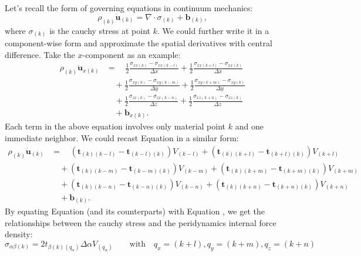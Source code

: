\documentclass[11pt,fullpage]{article}
\newcommand{\mb}[1]{\mathbf{#1}}
\newcommand{\blue}[1]{{\color{blue}{{#1}}}}
\begin{document}
Let's recall the form of governing equations in continuum mechanics:
\begin{equation}
\rho_{(k)}\ddot{\mb{u}}_{(k)} = \nabla\cdot\sigma_{(k)} + \mb{b}_{(k)},
\label{eq:4}
\end{equation}
where $\sigma_{(k)}$ is the cauchy stress at point $k$. We could further write it in a component-wise form and approximate the spatial derivatives with central difference. Take the $x$-component as an example:
\begin{equation}
\begin{aligned}
\rho_{(k)}\ddot{\mb{u}}_{x(k)} &= \quad \frac{1}{2}\frac{\sigma_{xx(k)} - \sigma_{xx(k-l)}}{\Delta x} + \frac{1}{2}\frac{\sigma_{xx(k+l)} - \sigma_{xx(k)}}{\Delta x}\\
                              &\quad+  \frac{1}{2}\frac{\sigma_{xy(k)} - \sigma_{xy(k-m)}}{\Delta y} + \frac{1}{2}\frac{\sigma_{xy(k+m)} - \sigma_{xy(k)}}{\Delta y}\\
                              &\quad+  \frac{1}{2}\frac{\sigma_{zx(k)} - \sigma_{zx(k-n)}}{\Delta z} + \frac{1}{2}\frac{\sigma_{xz(k+n)} - \sigma_{xz(k)}}{\Delta z}\\
                              &\quad + \mb{b}_{x(k)}.
\end{aligned}
\label{eq:5}
\end{equation}
Each term in the above equation involves only material point $k$ and one immediate neighbor. We could recast Equation \blue{\ref{eq:3}} in a similar form:
\begin{equation}
\begin{aligned}
\rho_{(k)}\ddot{\mb{u}}_{(k)} &= \quad (\mb{t}_{(k)(k-l)} - \mb{t}_{(k-l)(k)})V_{(k-l)} + (\mb{t}_{(k)(k+l)} - \mb{t}_{(k+l)(k)})V_{(k+l)}\\
                             &\quad + (\mb{t}_{(k)(k-m)} - \mb{t}_{(k-m)(k)})V_{(k-m)} + (\mb{t}_{(k)(k+m)} - \mb{t}_{(k+m)(k)})V_{(k+m)}\\
                             &\quad + (\mb{t}_{(k)(k-n)} - \mb{t}_{(k-n)(k)})V_{(k-n)} + (\mb{t}_{(k)(k+n)} - \mb{t}_{(k+n)(k)})V_{(k+n)}\\
                             &\quad  + \mb{b}_{(k)}.
\end{aligned}
\label{eq:6}
\end{equation}
By equating Equation \blue{\ref{eq:5}} (and its counterparts) with Equation \blue{\ref{eq:6}}, we get the relationships between the cauchy stress and the peridynamics internal force density:
\begin{equation}
\sigma_{\alpha\beta(k)} = 2t_{\beta(k)(q_\alpha)}\Delta\alpha V_{(q_\alpha)}\qquad \mathrm{with } \quad q_x=(k+l),q_y=(k+m),q_z=(k+n)
\label{eq:7}
\end{equation}
\end{document}
